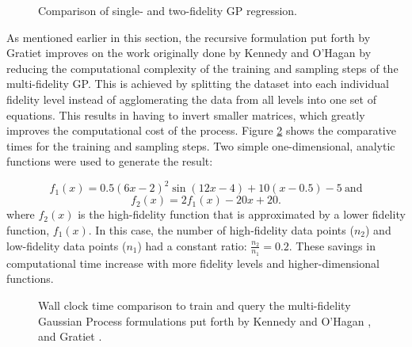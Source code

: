 \begin{figure}
    \centering
    \begin{subfigure}[\label{subfig:sf_gpr} Single-fidelity fit.] {
        \texttt{[image: code/image\_gen/gp\_analytical/images/hf\_4\_noise.png]} }
    \end{subfigure}
    \hfill
    \begin{subfigure}[\label{subfig:mf_gpr} Two-fidelity fit.]{
        \texttt{[image: code/image\_gen/gp\_analytical/images/mf\_4\_noise.png]} 
    }
    \end{subfigure}
    \caption{Comparison of single- and two-fidelity GP regression. \label{fig:mf_vs_sf_analytic}}
\end{figure}

As mentioned earlier in this section, the recursive formulation put forth by Gratiet \cite{le_gratiet_recursive_2014} improves on the work originally done by Kennedy and O'Hagan \cite{kennedy_predicting_2000} by reducing the computational complexity of the training and sampling steps of the multi-fidelity GP. This is achieved by splitting the dataset into each individual fidelity level instead of agglomerating the data from all levels into one set of equations. This results in having to invert smaller matrices, which greatly improves the computational cost of the process. Figure \ref{fig:time_comp} shows the comparative times for the training and sampling steps. Two simple one-dimensional, analytic functions were used to generate the result: 

\begin{equation}
    f_1(x) = 0.5 \left ( 6x - 2\right )^2 \sin{ \left (12x -4 \right )} + 10 \left ( x - 0.5 \right ) -5 ~\text{and}
\end{equation}
\begin{equation}
        f_2(x) = 2f_1(x) - 20x + 20.
\end{equation}
where $f_2(x)$ is the high-fidelity function that is approximated by a lower fidelity function, $f_1(x)$.
In this case, the number of high-fidelity data points ($n_2$) and low-fidelity data points ($n_1$) had a constant ratio: $\frac{n_2}{n_1} = 0.2$. These savings in computational time increase with more fidelity levels and higher-dimensional functions. 

\begin{figure}
    \centering
    \begin{subfigure}[Time taken to train the multi-fidelity GP.] {
        \texttt{[image: suthesis/images/time\_process.png]} }
    \end{subfigure}
    \hfill
    \begin{subfigure}[Time taken to sample the multi-fidelity GP.]{
        \texttt{[image: suthesis/images/time\_query.png]} 
    }
    \end{subfigure}
    \caption{Wall clock time comparison to train and query the multi-fidelity Gaussian Process formulations put forth by Kennedy and O'Hagan \cite{kennedy_predicting_2000}, and Gratiet \cite{gratiet_multi-fidelity_nodate}. \label{fig:time_comp}}
\end{figure}